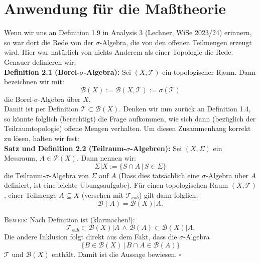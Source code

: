 \documentclass[11pt,english]{smfart}
\newcommand*{\QEDB}{\null\nobreak\hfill\ensuremath{\square}}
\begin{document}
\section{Anwendung für die Maßtheorie}
Wenn wir uns an Definition 1.9 in Analysis 3 (Lechner, WiSe 2023/24) erinnern, so war dort die Rede von der \(\sigma\)-Algebra, die von den offenen Teilmengen erzeugt wird. Hier war natürlich von nichts Anderem als einer Topologie die Rede. Genauer definieren wir:\\[0.5cm]
\textbf{Definition 2.1 (Borel-\(\sigma\)-Algebra):} Sei \((X,\mathcal{T})\) ein topologischer Raum. Dann bezeichnen wir mit:
\begin{equation}
    \mathcal{B}(X) := \mathcal{B}(X,\mathcal{T}) := \sigma(\mathcal{T})
\end{equation}
die Borel-\(\sigma\)-Algebra über \(X\).\\

Damit ist per Definition \(\mathcal{T} \subset \mathcal{B}(X)\). Denken wir nun zurück an Definition 1.4, so könnte folglich (berechtigt) die Frage aufkommen, wie sich dann (bezüglich der Teilraumtopologie) offene Mengen verhalten. Um diesen Zusammenhang korrekt zu lösen, halten wir fest:\\
\textbf{Satz und Definition 2.2 (Teilraum-\(\sigma\)-Algebren):} Sei \((X,\Sigma)\) ein Messraum, \(A \in \mathcal{P}(X)\). Dann nennen wir:
\begin{equation}
    \Sigma | X := \{S \cap A \, | \, S \in \Sigma\}
\end{equation}
die Teilraum-\(\sigma\)-Algebra von \(\Sigma\) auf \(A\) (Dass dies tatsächlich eine \(\sigma\)-Algebra über \(A\) definiert, ist eine leichte Übungsaufgabe). Für einen topologischen Raum \((X,\mathcal{T})\), einer Teilmenge \(A \subseteq X\) (versehen mit \(\mathcal{T}_{sub}\)) gilt dann folglich:
\begin{equation}
    \mathcal{B}(A) = \mathcal{B}(X) | A.
\end{equation}

\textsc{Beweis:} Nach Definition ist (klarmachen!):
\begin{equation}
    \mathcal{T}_{sub} \subset \mathcal{B}(X) | A \, \land \, \mathcal{B}(A) \subset \mathcal{B}(X) | A.
\end{equation}
Die andere Inklusion folgt direkt aus dem Fakt, dass die \(\sigma\)-Algebra
\begin{equation}
    \{B \in \mathcal{B}(X) \, | \, B \cap A \in \mathcal{B}(A)\}
\end{equation}
\(\mathcal{T}\) und \(\mathcal{B}(X)\) enthält. Damit ist die Aussage bewiesen. \QEDB
\end{document}
